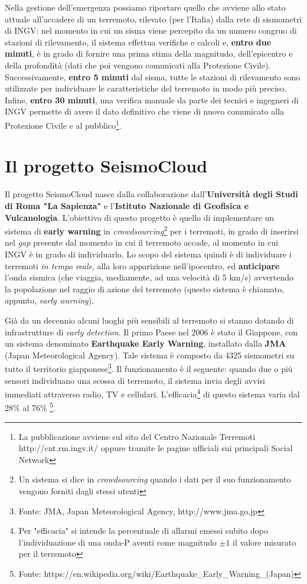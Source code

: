 \documentclass[a4paper,10pt]{memoir}
\begin{document}
Nella gestione dell'emergenza possiamo riportare quello che avviene allo stato attuale all'accadere di un terremoto, rilevato (per l'Italia) dalla rete di sismometri di INGV: nel momento in cui un sisma viene percepito da un numero congruo di stazioni di rilevamento, il sistema effettua verifiche e calcoli e, \textbf{entro due minuti}, è in grado di fornire una prima stima della magnitudo, dell'epicentro e della profondità (dati che poi vengono comunicati alla Protezione Civile). Successivamente, \textbf{entro 5 minuti} dal sisma, tutte le stazioni di rilevamento sono utilizzate per individuare le caratteristiche del terremoto in modo più preciso. Infine, \textbf{entro 30 minuti}, una verifica manuale da parte dei tecnici e ingegneri di INGV permette di avere il dato definitivo che viene di nuovo comunicato alla Protezione Civile e al pubblico\footnote{La pubblicazione avviene sul sito del Centro Nazionale Terremoti http://cnt.rm.ingv.it/ oppure tramite le pagine ufficiali sui principali Social Network}.

\section{Il progetto SeismoCloud}

Il progetto SeismoCloud nasce dalla collaborazione dall'\textbf{Università degli Studi di Roma "La Sapienza"} e l'\textbf{Istituto Nazionale di Geofisica e Vulcanologia}. L'obiettivo di questo progetto è quello di implementare un sistema di \textbf{early warning} in \textit{crowdsourcing}\footnote{Un sistema si dice in \textit{crowdsourcing} quando i dati per il suo funzionamento vengono forniti dagli stessi utenti} per i terremoti, in grado di inserirsi nel \textit{gap} presente dal momento in cui il terremoto accade, al momento in cui INGV è in grado di individuarlo. Lo scopo del sistema quindi è di individuare i terremoti \textit{in tempo reale}, alla loro apparizione nell'ipocentro, ed \textbf{anticipare} l'onda sismica (che viaggia, mediamente, ad una velocità di 5 km/s) avvertendo la popolazione nel raggio di azione del terremoto (questo sistema è chiamato, appunto, \textit{early warning}).

Già da un decennio alcuni luoghi più sensibili al terremoto si stanno dotando di infrastrutture di \textit{early detection}. Il primo Paese nel 2006 è stato il Giappone, con un sistema denominato \textbf{Earthquake Early Warning}, installato dalla \textbf{JMA} (Japan Meteorological Agency). Tale sistema è composto da 4325 sismometri su tutto il territorio giapponese\footnote{Fonte: JMA, Japan Meteorological Agency, http://www.jma.go.jp}. Il funzionamento è il seguente: quando due o più sensori individuano una scossa di terremoto, il sistema invia degli avvisi immediati attraverso radio, TV e cellulari. L'efficacia\footnote{Per "efficacia" si intende la percentuale di allarmi emessi subito dopo l'individuazione di una onda-P aventi come magnitudo $\pm1$ il valore misurato per il terremoto} di questo sistema varia dal 28\% al 76\% \footnote{Fonte: https://en.wikipedia.org/wiki/Earthquake\_Early\_Warning\_(Japan)}.
\end{document}
